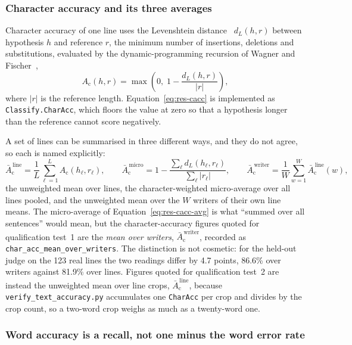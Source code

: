 \subsubsection{Character accuracy and its three averages}

Character accuracy of one line uses the Levenshtein distance~\cite{levenshtein1966} $d_L(h,r)$ between hypothesis $h$ and reference $r$, the minimum number of insertions, deletions and substitutions, evaluated by the dynamic-programming recursion of Wagner and Fischer~\cite{wagner1974},
\begin{equation}
\label{eq:res-cacc}
A_{\mathrm{c}}(h,r)=\max\left(0,\;1-\frac{d_L(h,r)}{\lvert r\rvert}\right),
\end{equation}
where $\lvert r\rvert$ is the reference length.
Equation~\ref{eq:res-cacc} is implemented as \texttt{Classify.CharAcc}, which floors the value at zero so that a hypothesis longer than the reference cannot score negatively.

A set of lines can be summarised in three different ways, and they do not agree, so each is named explicitly:
\begin{equation}
\label{eq:res-cacc-avg}
\bar A_{\mathrm{c}}^{\,\mathrm{line}}=\frac{1}{L}\sum_{\ell=1}^{L}A_{\mathrm{c}}(h_\ell,r_\ell),\qquad
\bar A_{\mathrm{c}}^{\,\mathrm{micro}}=1-\frac{\sum_\ell d_L(h_\ell,r_\ell)}{\sum_\ell\lvert r_\ell\rvert},\qquad
\bar A_{\mathrm{c}}^{\,\mathrm{writer}}=\frac{1}{W}\sum_{w=1}^{W}\bar A_{\mathrm{c}}^{\,\mathrm{line}}(w),
\end{equation}
the unweighted mean over lines, the character-weighted micro-average over all lines pooled, and the unweighted mean over the $W$ writers of their own line means.
The micro-average of Equation~\ref{eq:res-cacc-avg} is what ``summed over all sentences'' would mean, but the character-accuracy figures quoted for qualification test~1 are the \emph{mean over writers}, $\bar A_{\mathrm{c}}^{\,\mathrm{writer}}$, recorded as \texttt{char\_acc\_mean\_over\_writers}.
The distinction is not cosmetic: for the held-out judge on the 123 real lines the two readings differ by 4.7 points, 86.6\% over writers against 81.9\% over lines.
Figures quoted for qualification test~2 are instead the unweighted mean over line crops, $\bar A_{\mathrm{c}}^{\,\mathrm{line}}$, because \texttt{verify\_text\_accuracy.py} accumulates one \texttt{CharAcc} per crop and divides by the crop count, so a two-word crop weighs as much as a twenty-word one.

\subsubsection{Word accuracy is a recall, not one minus the word error rate}

